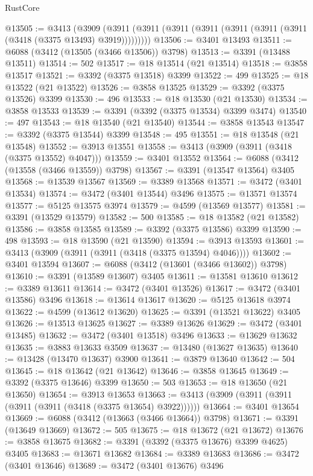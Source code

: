 \begin{lexlean}{RustCore}
\begin{coremodule}
@13505 := @3413
    (@3909 (@3911 (@3911 (@3911 (@3911 (@3911 (@3911 (@3911 (@3418 (@3375 @13493) @3919)))))))))
@13506 := @3401 @13493
@13511 := @6088 (@3412 (@13505 (@3466 @13506)) @3798)
@13513 := @3391 (@13488 @13511)
@13514 := 502
@13517 := @18 @13514 (@21 @13514)
@13518 := @3858 @13517
@13521 := @3392 (@3375 @13518) @3399
@13522 := 499
@13525 := @18 @13522 (@21 @13522)
@13526 := @3858 @13525
@13529 := @3392 (@3375 @13526) @3399
@13530 := 496
@13533 := @18 @13530 (@21 @13530)
@13534 := @3858 @13533
@13539 := @3391 (@3392 (@3375 @13534) @3399 @3474)
@13540 := 497
@13543 := @18 @13540 (@21 @13540)
@13544 := @3858 @13543
@13547 := @3392 (@3375 @13544) @3399
@13548 := 495
@13551 := @18 @13548 (@21 @13548)
@13552 := @3913 @13551
@13558 := @3413 (@3909 (@3911 (@3418 (@3375 @13552) @4047)))
@13559 := @3401 @13552
@13564 := @6088 (@3412 (@13558 (@3466 @13559)) @3798)
@13567 := @3391 (@13547 @13564) @3405
@13568 := @13539 @13567
@13569 := @3389 @13568
@13571 := @3472 (@3401 @13534)
@13574 := @3472 (@3401 @13544) @3496
@13575 := @13571 @13574
@13577 := @5125 @13575 @3974
@13579 := @4599 (@13569 @13577)
@13581 := @3391 (@13529 @13579)
@13582 := 500
@13585 := @18 @13582 (@21 @13582)
@13586 := @3858 @13585
@13589 := @3392 (@3375 @13586) @3399
@13590 := 498
@13593 := @18 @13590 (@21 @13590)
@13594 := @3913 @13593
@13601 := @3413 (@3909 (@3911 (@3911 (@3418 (@3375 @13594) @4046))))
@13602 := @3401 @13594
@13607 := @6088 (@3412 (@13601 (@3466 @13602)) @3798)
@13610 := @3391 (@13589 @13607) @3405
@13611 := @13581 @13610
@13612 := @3389 @13611
@13614 := @3472 (@3401 @13526)
@13617 := @3472 (@3401 @13586) @3496
@13618 := @13614 @13617
@13620 := @5125 @13618 @3974
@13622 := @4599 (@13612 @13620)
@13625 := @3391 (@13521 @13622) @3405
@13626 := @13513 @13625
@13627 := @3389 @13626
@13629 := @3472 (@3401 @13485)
@13632 := @3472 (@3401 @13518) @3496
@13633 := @13629 @13632
@13635 := @3883 @13633 @3509
@13637 := @13480 (@13627 @13635)
@13640 := @13428 (@13470 @13637) @3900
@13641 := @3879 @13640
@13642 := 504
@13645 := @18 @13642 (@21 @13642)
@13646 := @3858 @13645
@13649 := @3392 (@3375 @13646) @3399
@13650 := 503
@13653 := @18 @13650 (@21 @13650)
@13654 := @3913 @13653
@13663 := @3413 (@3909 (@3911 (@3911 (@3911 (@3911 (@3418 (@3375 @13654) @3922))))))
@13664 := @3401 @13654
@13669 := @6088 (@3412 (@13663 (@3466 @13664)) @3798)
@13671 := @3391 (@13649 @13669)
@13672 := 505
@13675 := @18 @13672 (@21 @13672)
@13676 := @3858 @13675
@13682 := @3391 (@3392 (@3375 @13676) @3399 @4625) @3405
@13683 := @13671 @13682
@13684 := @3389 @13683
@13686 := @3472 (@3401 @13646)
@13689 := @3472 (@3401 @13676) @3496

\end{coremodule}
\end{lexlean}
